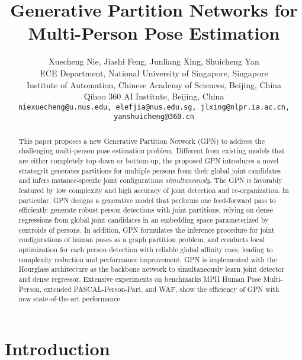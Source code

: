 \documentclass[10pt,twocolumn,letterpaper]{article}
\begin{document}
\title{Generative Partition Networks for Multi-Person Pose Estimation}

\author{
  Xuecheng Nie, Jiashi Feng, Junliang Xing, Shuicheng Yan\\
  ECE Department, National University of Singapore, Singapore\\
  Institute of Automation, Chinese Academy of Sciences, Beijing, China\\
  Qihoo 360 AI Institute, Beijing, China \\
  \footnotesize{\texttt{niexuecheng@u.nus.edu, elefjia@nus.edu.sg, jlxing@nlpr.ia.ac.cn, yanshuicheng@360.cn}} \\
}

\maketitle


\begin{abstract}
   This paper proposes a new Generative Partition Network (GPN) to address the challenging multi-person pose estimation problem. Different from existing  models that are either completely
   top-down or bottom-up, the proposed GPN introduces a novel strategy\textemdash it generates partitions for multiple persons from their global joint candidates and infers instance-specific
   joint configurations \emph{simultaneously}.
   The GPN is favorably featured by low complexity and high accuracy of joint detection and re-organization.
   In particular, GPN designs a generative model that performs one feed-forward pass to efficiently generate robust person detections with joint partitions, relying on dense regressions from
   global joint candidates in an embedding space parameterized by centroids of persons.
   In addition, GPN formulates the inference procedure for joint configurations of human poses as a graph partition problem, and conducts local optimization for each person
   detection with reliable global affinity cues, leading to complexity reduction and performance improvement. GPN is implemented with the Hourglass architecture as the backbone network to
   simultaneously learn joint detector and dense regressor.
   Extensive experiments on benchmarks MPII Human Pose Multi-Person, extended PASCAL-Person-Part, and WAF, show the efficiency of GPN with new state-of-the-art performance.
\end{abstract}

\section{Introduction}
\end{document}
